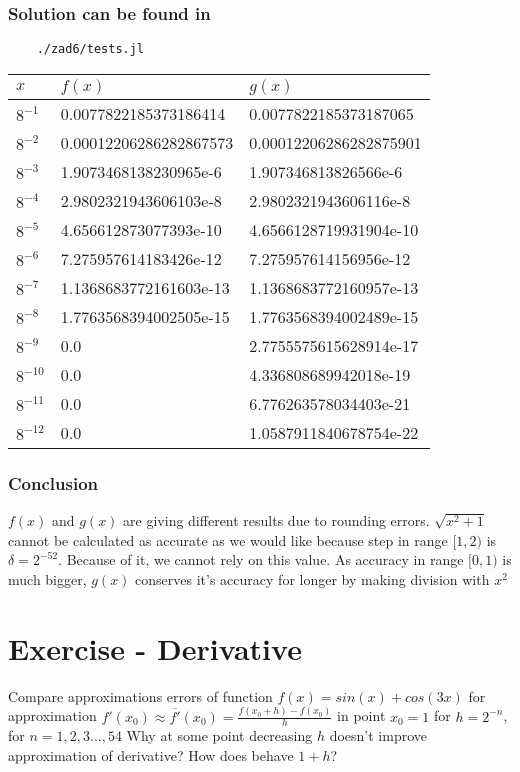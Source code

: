 \documentclass[12pt]{article}
\begin{document}
\subsubsection*{Solution can be found in}
\begin{verbatim}
    ./zad6/tests.jl
\end{verbatim}
\begin{table}[!ht]
    \centering
    \begin{tabular}{|l|l|l|}
    \hline
    $x$ & $f(x)$ & $g(x)$ \\ \hline
    $8^{-1}$ & 0.0077822185373186414 & 0.0077822185373187065 \\ \hline
    $8^{-2}$ & 0.00012206286282867573 & 0.00012206286282875901 \\ \hline
    $8^{-3}$ & 1.9073468138230965e-6 & 1.907346813826566e-6 \\ \hline
    $8^{-4}$ & 2.9802321943606103e-8 & 2.9802321943606116e-8 \\ \hline
    $8^{-5}$ & 4.656612873077393e-10 & 4.6566128719931904e-10 \\ \hline
    $8^{-6}$ & 7.275957614183426e-12 & 7.275957614156956e-12 \\ \hline
    $8^{-7}$ & 1.1368683772161603e-13 & 1.1368683772160957e-13 \\ \hline
    $8^{-8}$ & 1.7763568394002505e-15 & 1.7763568394002489e-15 \\ \hline
    $8^{-9}$ & 0.0 & 2.7755575615628914e-17 \\ \hline
    $8^{-10}$ & 0.0 & 4.336808689942018e-19 \\ \hline
    $8^{-11}$ & 0.0 & 6.776263578034403e-21 \\ \hline
    $8^{-12}$ & 0.0 & 1.0587911840678754e-22 \\ \hline
    \end{tabular}
\end{table}
\subsubsection*{Conclusion}
$f(x)$ and $g(x)$ are giving different results due to rounding errors. \newline
$\sqrt{x^2 + 1}$ cannot be calculated as accurate as we would like because step in range $[1,2)$ is $\delta=2^{-52}$. 
Because of it, we cannot rely on this value. As accuracy in range $[0, 1)$ is much bigger, $g(x)$ conserves it's  accuracy for longer by making division with $x^2$
\section{Exercise - Derivative}
Compare approximations errors of function $f(x) = sin(x) + cos(3x)$ for approximation $f'(x_0) \approx \overline{f'}(x_0) = \frac{f(x_0 + h) - f(x_0)}{h}$ in point $x_0 = 1$ for $ h = 2^{-n}$, for $n=1,2,3...,54$\newline
Why at some point decreasing $h$ doesn't improve approximation of derivative?\newline
How does behave $1+h$?\newline
\end{document}
